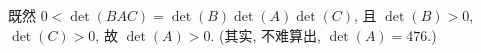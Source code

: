 \begin{example}[continues=emp:NonzeroDet2]
    既然 \(0 < \det {(BAC)} = \det {(B)} \det {(A)} \det {(C)}\),
    且 \(\det {(B)} > 0\), \(\det {(C)} > 0\),
    故 \(\det {(A)} > 0\).
    (其实, 不难算出, \(\det {(A)} = 476.\))
\end{example}

\endgroup
